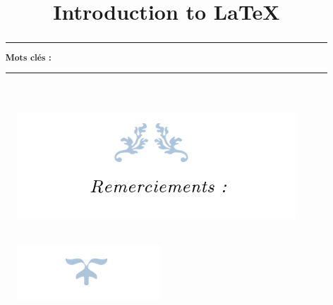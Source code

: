 \documentclass{myReport}
\title{Introduction to \LaTeX}
\begin{document}
\jury{

}
\makecoverpage
\newpage

\renewcommand{\abstractnamefont}{\normalfont\LARGE\bfseries}

\thispagestyle{empty}


\begin{figure}[!h]

\begin{center}
\vspace{2cm}
\includegraphics[height=4cm]{images/rem1.PNG}
\end{center}
\end{figure}

\hskip7mm



\begin{spacing}{1.3}






\end{spacing}

\begin{figure}[!h]

\begin{center}
\\ [2 cm]
\includegraphics[height=2cm]{images/rem2.PNG}
\end{center}
\end{figure}
\renewcommand{\abstractname}{\LARGE \bfseries Résumé}
\renewcommand{\abstractnamefont}{\LARGE \bfseries}
\begin{abstract}

 
\vspace{1cm}


\noindent\rule[2pt]{\textwidth}{0.5pt}

{\textbf{Mots clés :}}
\\ 
 
\noindent\rule[2pt]{\textwidth}{0.5pt}
\end{abstract}
\renewcommand{\abstractname}{Abstract} 
\end{document}
